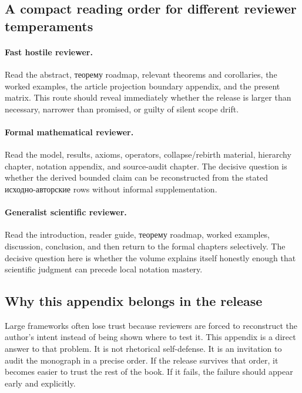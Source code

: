 \subsection{A compact reading order for different reviewer temperaments}

\paragraph{Fast hostile reviewer.}
Read the abstract, теорему roadmap, relevant theorems and corollaries, the worked examples,
the article projection boundary appendix, and the present matrix. This route should reveal immediately
whether the release is larger than necessary, narrower than promised, or guilty of silent scope
drift.

\paragraph{Formal mathematical reviewer.}
Read the model, results, axioms, operators, collapse/rebirth material, hierarchy chapter,
notation appendix, and source-audit chapter. The decisive question is whether the derived bounded
claim can be reconstructed from the stated исходно-авторские rows without informal supplementation.

\paragraph{Generalist scientific reviewer.}
Read the introduction, reader guide, теорему roadmap, worked examples, discussion, conclusion,
and then return to the formal chapters selectively. The decisive question here is whether the
volume explains itself honestly enough that scientific judgment can precede local notation
mastery.

\subsection{Why this appendix belongs in the release}

Large frameworks often lose trust because reviewers are forced to reconstruct the author's intent
instead of being shown where to test it. This appendix is a direct answer to that problem. It is
not rhetorical self-defense. It is an invitation to audit the monograph in a precise order.
If the release survives that order, it becomes easier to trust the rest of the book. If it fails,
the failure should appear early and explicitly.

\clearpage
